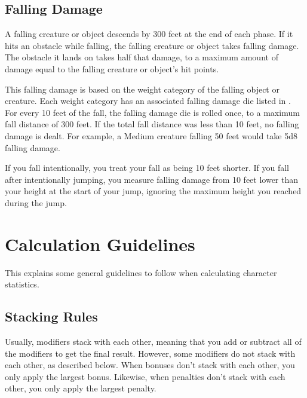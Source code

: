   \subsection{Falling Damage}\label{Falling Damage}
    A falling creature or object descends by 300 feet at the end of each phase.
    If it hits an obstacle while falling, the falling creature or object takes falling damage.
    The obstacle it lands on takes half that damage, to a maximum amount of damage equal to the falling creature or object's hit points.

    This falling damage is based on the weight category of the falling object or creature.
    Each weight category has an associated falling damage die listed in .
    For every 10 feet of the fall, the falling damage die is rolled once, to a maximum fall distance of 300 feet.
    If the total fall distance was less than 10 feet, no falling damage is dealt.
    For example, a Medium creature falling 50 feet would take 5d8 falling damage.

    If you fall intentionally, you treat your fall as being 10 feet shorter.
    If you fall after intentionally jumping, you measure falling damage from 10 feet lower than your height at the start of your jump, ignoring the maximum height you reached during the jump.

\section{Calculation Guidelines}
  This explains some general guidelines to follow when calculating character statistics.

  \subsection{Stacking Rules}\label{Stacking Rules}
    Usually, modifiers stack with each other, meaning that you add or subtract all of the modifiers to get the final result.
    However, some modifiers do not stack with each other, as described below.
    When bonuses don't stack with each other, you only apply the largest bonus.
    Likewise, when penalties don't stack with each other, you only apply the largest penalty.

